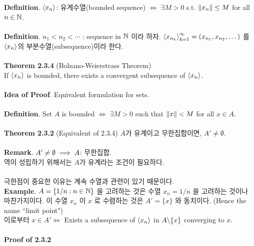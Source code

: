\textbf{Definition}. $\left\langle x_n \right\rangle$: 유계수열(bounded sequence) $\iff$ $\exists M>0$ s.t. $\left\lVert x_n\right\rVert\leq M$ for all $n\in \mathbb{N}$.\\
\\
\textbf{Definition}. $n_1<n_2<\cdots$ : sequence in $\mathbb{N}$ 이라 하자. $\left\langle x_{n_k} \right\rangle_{k=1}^\infty = (x_{n_1}, x_{n_2}, \dots)$ 를 $\left\langle x_n \right\rangle$의 부분수열(subsequence)이라 한다. \\
\\
\textbf{Theorem 2.3.4} (Bolzano-Weierstrass Theorem)\\
If $\left\langle x_n \right\rangle$ is bounded, there exists a convergent subsequence of $\left\langle x_n \right\rangle$.\\
\\
\textbf{Idea of Proof}. Equivalent formulation for sets.\\
\\
\textbf{Definition}. Set $A$ is bounded $\iff$ $\exists M>0$ such that $\left\lVert x\right\rVert<M$ for all $x\in A$.\\
\\
\textbf{Theorem 2.3.2} (Equivalent of 2.3.4) $A$가 유계이고 무한집합이면, $A'\neq \emptyset$.\\
\\
\textbf{Remark}. $A'\neq \emptyset \implies A$: 무한집합.\\
역이 성립하기 위해서는 $A$가 유계라는 조건이 필요하다.\\
\\
극한점이 중요한 이유는 계속 수열과 관련이 있기 때문이다.\\
\textbf{Example}. $A = \{1/n: n\in \mathbb{N}\}$ 을 고려하는 것은 수열 $x_n=1/n$ 을 고려하는 것이나 마찬가지이다. 이 수열 $x_n$ 이 $x$ 로 수렴하는 것은 $A'=\{x\}$ 와 동치이다. (Hence the name ``limit point")\\
이로부터 $x\in A' \iff $ Exists a subsequence of $\left\langle x_n \right\rangle$ in $A\backslash \{x\}$ converging to $x$.\\
\\
\textbf{Proof of 2.3.2}
